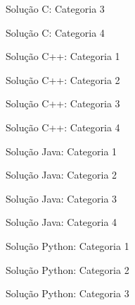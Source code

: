\begin{frame}[fragile]{Solução C: Categoria 3}
\end{frame}

\begin{frame}[fragile]{Solução C: Categoria 4}
\end{frame}

\begin{frame}[fragile]{Solução C++: Categoria 1}
\end{frame}

\begin{frame}[fragile]{Solução C++: Categoria 2}
\end{frame}

\begin{frame}[fragile]{Solução C++: Categoria 3}
\end{frame}

\begin{frame}[fragile]{Solução C++: Categoria 4}
\end{frame}

\begin{frame}[fragile]{Solução Java: Categoria 1}
\end{frame}

\begin{frame}[fragile]{Solução Java: Categoria 2}
\end{frame}

\begin{frame}[fragile]{Solução Java: Categoria 3}
\end{frame}

\begin{frame}[fragile]{Solução Java: Categoria 4}
\end{frame}

\begin{frame}[fragile]{Solução Python: Categoria 1}
\end{frame}

\begin{frame}[fragile]{Solução Python: Categoria 2}
\end{frame}

\begin{frame}[fragile]{Solução Python: Categoria 3}
\end{frame}

